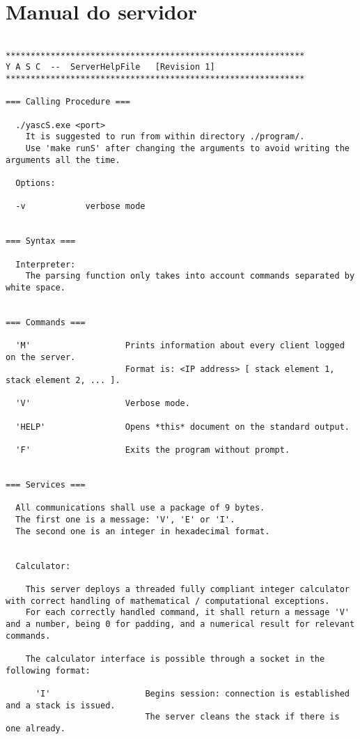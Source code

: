 \section{Manual do servidor}

\begin{lstlisting}

************************************************************
Y A S C  --  ServerHelpFile   [Revision 1]
************************************************************

=== Calling Procedure ===

  ./yascS.exe <port>
    It is suggested to run from within directory ./program/.
    Use 'make runS' after changing the arguments to avoid writing the arguments all the time.

  Options:

  -v            verbose mode


=== Syntax ===

  Interpreter:
    The parsing function only takes into account commands separated by white space.


=== Commands ===

  'M'                   Prints information about every client logged on the server.
                        Format is: <IP address> [ stack element 1, stack element 2, ... ].

  'V'                   Verbose mode.

  'HELP'                Opens *this* document on the standard output.

  'F'                   Exits the program without prompt.


=== Services ===

  All communications shall use a package of 9 bytes.
  The first one is a message: 'V', 'E' or 'I'.
  The second one is an integer in hexadecimal format.


  Calculator:

    This server deploys a threaded fully compliant integer calculator with correct handling of mathematical / computational exceptions.
    For each correctly handled command, it shall return a message 'V' and a number, being 0 for padding, and a numerical result for relevant commands.

    The calculator interface is possible through a socket in the following format:

      'I'                   Begins session: connection is established and a stack is issued.
                            The server cleans the stack if there is one already.


\end{lstlisting}

